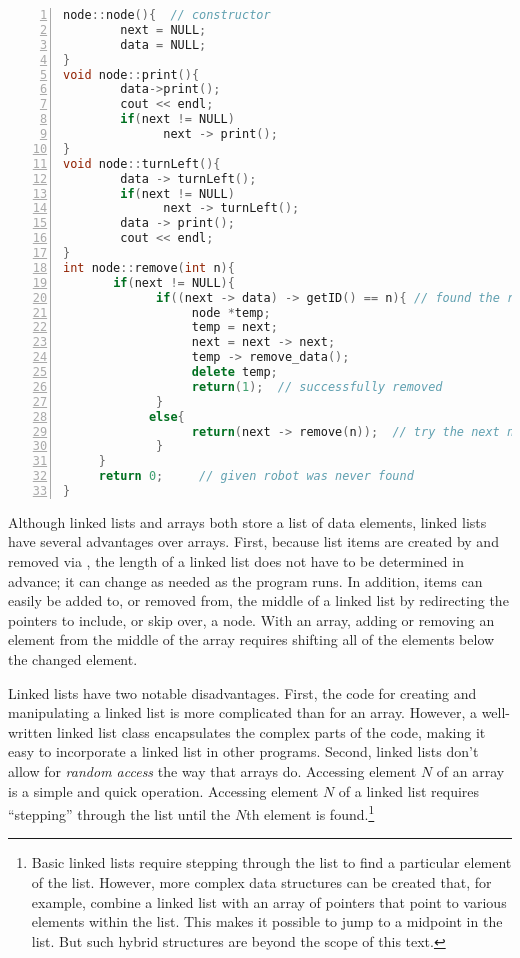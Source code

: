 \begin{minipage}{\textwidth}
\renewcommand*\thelstnumber{\the\value{lstnumber}d}
\begin{lstlisting}[language=C++,numbers = left,xleftmargin=4.0ex, basicstyle=\small, emph={next,data,temp},emphstyle = \color{\mycolor},
showstringspaces=false,
caption = {The definitions of the \cf{node} class functions. },
label={listing:nodecpp}]
node::node(){  // constructor
        next = NULL;
        data = NULL;
}
void node::print(){
        data->print();
        cout << endl;
        if(next != NULL)
              next -> print();
}
void node::turnLeft(){
        data -> turnLeft();
        if(next != NULL)
              next -> turnLeft();
        data -> print();
        cout << endl;
}
int node::remove(int n){
       if(next != NULL){
             if((next -> data) -> getID() == n){ // found the right ID
                  node *temp;
                  temp = next;
                  next = next -> next;
                  temp -> remove_data();
                  delete temp;
                  return(1);  // successfully removed
             }
            else{
                  return(next -> remove(n));  // try the next node
             }
     }
     return 0;     // given robot was never found
}
\end{lstlisting}
\end{minipage}  


Although linked lists and arrays both store a list of data elements, linked lists have several advantages over arrays.  First, because list items are created by  and removed via , the length of a linked list does not have to be determined in advance; it can change as needed as the program runs.  In addition, items can easily be added to, or removed from, the middle of a linked list by redirecting the pointers to include, or skip over, a node.  With an array, adding or removing an element from the middle of the array requires shifting all of the elements below the changed element.

Linked lists have two notable disadvantages.  First, the code for creating and manipulating a linked list is  more complicated than for an array.  However, a well-written linked list class encapsulates the complex parts of the code, making it easy to incorporate a linked list in other programs.  Second, linked lists don't allow for \emph{random access} the way that arrays do.  Accessing element $N$ of an array is a simple and quick operation.  Accessing element $N$ of a linked list requires ``stepping'' through the list until the $N$th element is found.\footnote{Basic linked lists require stepping through the list to find a particular element of the list.  However, more complex data structures can be created that, for example, combine a linked list with an array of pointers that point to various elements within the list.  This makes it possible to jump to a midpoint in the list.  But such hybrid structures are beyond the scope of this text.} 



